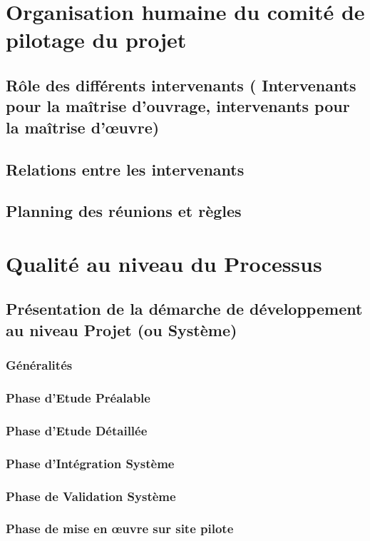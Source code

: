                                                               
\section{Organisation humaine du comité de pilotage du projet}
\subsection{Rôle des différents intervenants ( Intervenants pour la maîtrise d’ouvrage, intervenants pour la maîtrise d’œuvre)}
\subsection{Relations entre les intervenants}
\subsection{Planning des réunions et règles}

\section{Qualité au niveau du Processus}
\subsection{Présentation de la démarche de développement au niveau Projet (ou Système)}
\subsubsection{Généralités              }
\subsubsection{Phase d’Etude Préalable }
\subsubsection{Phase d’Etude Détaillée}
\subsubsection{Phase d’Intégration Système }
\subsubsection{Phase de Validation Système}
\subsubsection{Phase de mise en œuvre sur site pilote}
